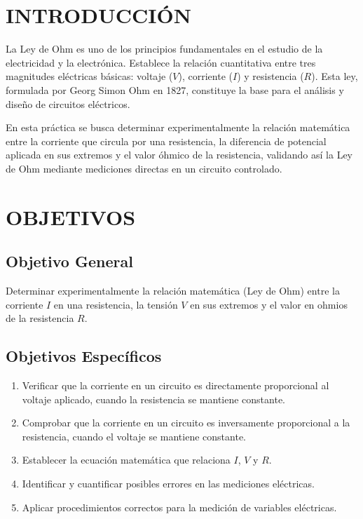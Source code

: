 \documentclass[12pt]{article}
\begin{document}
\tableofcontents
\newpage

\listoffigures
\listoftables
\newpage

\section{INTRODUCCIÓN}
\label{sec:introduccion}

La Ley de Ohm es uno de los principios fundamentales en el estudio de la electricidad y la electrónica. Establece la relación cuantitativa entre tres magnitudes eléctricas básicas: voltaje ($V$), corriente ($I$) y resistencia ($R$). Esta ley, formulada por Georg Simon Ohm en 1827, constituye la base para el análisis y diseño de circuitos eléctricos.

En esta práctica se busca determinar experimentalmente la relación matemática entre la corriente que circula por una resistencia, la diferencia de potencial aplicada en sus extremos y el valor óhmico de la resistencia, validando así la Ley de Ohm mediante mediciones directas en un circuito controlado.

\section{OBJETIVOS}
\label{sec:objetivos}

\subsection{Objetivo General}
Determinar experimentalmente la relación matemática (Ley de Ohm) entre la corriente $I$ en una resistencia, la tensión $V$ en sus extremos y el valor en ohmios de la resistencia $R$.

\subsection{Objetivos Específicos}
\begin{enumerate}
    \item Verificar que la corriente en un circuito es directamente proporcional al voltaje aplicado, cuando la resistencia se mantiene constante.
    \item Comprobar que la corriente en un circuito es inversamente proporcional a la resistencia, cuando el voltaje se mantiene constante.
    \item Establecer la ecuación matemática que relaciona $I$, $V$ y $R$.
    \item Identificar y cuantificar posibles errores en las mediciones eléctricas.
    \item Aplicar procedimientos correctos para la medición de variables eléctricas.
\end{enumerate}
\end{document}
